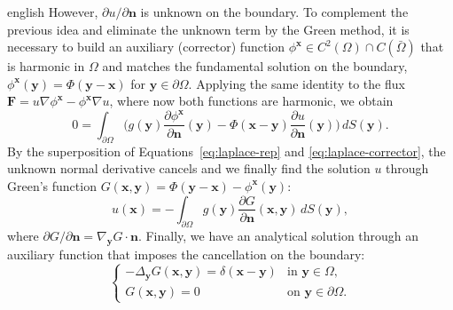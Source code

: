 \documentclass[0000.tex]{subfiles}
\begin{document}
\begin{hyphenrules}{english}
However, $\partial u/\partial\mathbf{n}$ is unknown on the boundary. To complement the previous idea and
eliminate the unknown term by the Green method, it is necessary to build an auxiliary (corrector)
function $\phi^{\mathbf{x}}\in C^2(\Omega)\cap C(\bar\Omega)$ that is harmonic in $\Omega$ and matches the
fundamental solution on the boundary, $\phi^{\mathbf{x}}(\mathbf{y})=\Phi(\mathbf{y}-\mathbf{x})$ for $\mathbf{y}\in\partial\Omega$. Applying
the same identity to the flux $\mathbf{F}=u\nabla\phi^{\mathbf{x}}-\phi^{\mathbf{x}}\nabla u$, where now both functions are
harmonic, we obtain
\begin{equation}
  0=\int_{\partial\Omega}\Big(g(\mathbf{y})\frac{\partial\phi^{\mathbf{x}}}{\partial\mathbf{n}}(\mathbf{y})
    -\Phi(\mathbf{x}-\mathbf{y})\frac{\partial u}{\partial\mathbf{n}}(\mathbf{y})\Big)\,d S(\mathbf{y}).
  \label{eq:laplace-corrector}
\end{equation}
By the superposition of Equations~\eqref{eq:laplace-rep} and \eqref{eq:laplace-corrector}, the unknown normal derivative
cancels and we finally find the solution $u$ through Green's function
$G(\mathbf{x},\mathbf{y})=\Phi(\mathbf{y}-\mathbf{x})-\phi^{\mathbf{x}}(\mathbf{y})$:
\begin{equation}
  u(\mathbf{x})=-\int_{\partial\Omega}g(\mathbf{y})\frac{\partial G}{\partial\mathbf{n}}(\mathbf{x},\mathbf{y})\,d S(\mathbf{y}),
  \label{eq:app-laplace-green}
\end{equation}
where $\partial G/\partial\mathbf{n}=\nabla_{\mathbf{y}}G\cdot\mathbf{n}$. Finally, we have an analytical solution through an
auxiliary function that imposes the cancellation on the boundary:
\begin{equation}
  \begin{cases}
    -\Delta_{\mathbf{y}}G(\mathbf{x},\mathbf{y})=\delta(\mathbf{x}-\mathbf{y}) & \text{in } \mathbf{y}\in\Omega,\\
    G(\mathbf{x},\mathbf{y})=0 & \text{on } \mathbf{y}\in\partial\Omega.
  \end{cases}
  \label{eq:app-green-function}
\end{equation}


\end{hyphenrules}
\end{document}
